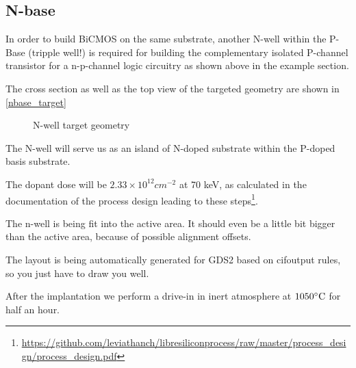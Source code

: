 \subsection{N-base}\label{nbase_chapter}
In order to build BiCMOS on the same substrate, another N-well within the P-Base (tripple well!) is required for building the complementary isolated P-channel transistor for a n-p-channel logic circuitry as shown above in the example section.

The cross section as well as the top view of the targeted geometry are shown in \autoref{nbase_target}

\begin{figure}[H]
	\centering
	\begin{tikzpicture}[node distance = 3cm, auto, thick,scale=\CrossAndTopSectionBig, every node/.style={transform shape}]
		
	\end{tikzpicture}
	\begin{tikzpicture}[node distance = 3cm, auto, thick,scale=\CrossAndTopSectionBig, every node/.style={transform shape}]
		
	\end{tikzpicture}
	\caption{N-well target geometry}
	\label{nbase_target}
\end{figure}

The N-well will serve us as an island of N-doped substrate within the P-doped basis substrate.

The dopant dose will be $2.33\times10^{12}cm^{-2}$ at 70 keV, as calculated in the documentation of the process design leading to these steps\footnote{\url{https://github.com/leviathanch/libresiliconprocess/raw/master/process_design/process_design.pdf}}.

The n-well is being fit into the active area. It should even be a little bit bigger than the active area, because of possible alignment offsets.

The layout is being automatically generated for GDS2 based on cifoutput rules, so you just have to draw you well.

After the implantation we perform a drive-in in inert atmosphere at $1050\degreesC$ for half an hour.
